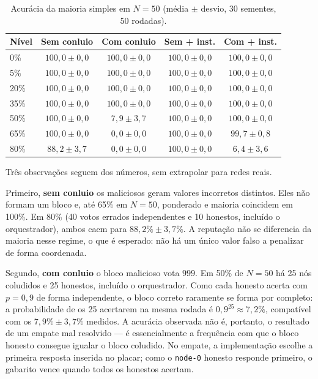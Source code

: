 \documentclass[12pt]{article}
\begin{document}
\begin{table}[htbp]
\centering
\caption{Acurácia da maioria simples em $N=50$ (média $\pm$ desvio, 30 sementes, 50 rodadas).}
\label{tab:n50-maj}
\footnotesize
\begin{tabular}{|l|c|c|c|c|}
\hline
\textbf{Nível} & \textbf{Sem conluio} & \textbf{Com conluio} & \textbf{Sem + inst.} & \textbf{Com + inst.} \\
\hline
0\%  & $100{,}0\pm 0{,}0$ & $100{,}0\pm 0{,}0$ & $100{,}0\pm 0{,}0$ & $100{,}0\pm 0{,}0$ \\
5\%  & $100{,}0\pm 0{,}0$ & $100{,}0\pm 0{,}0$ & $100{,}0\pm 0{,}0$ & $100{,}0\pm 0{,}0$ \\
20\% & $100{,}0\pm 0{,}0$ & $100{,}0\pm 0{,}0$ & $100{,}0\pm 0{,}0$ & $100{,}0\pm 0{,}0$ \\
35\% & $100{,}0\pm 0{,}0$ & $100{,}0\pm 0{,}0$ & $100{,}0\pm 0{,}0$ & $100{,}0\pm 0{,}0$ \\
50\% & $100{,}0\pm 0{,}0$ & $7{,}9\pm 3{,}7$   & $100{,}0\pm 0{,}0$ & $100{,}0\pm 0{,}0$ \\
65\% & $100{,}0\pm 0{,}0$ & $0{,}0\pm 0{,}0$   & $100{,}0\pm 0{,}0$ & $99{,}7\pm 0{,}8$ \\
80\% & $88{,}2\pm 3{,}7$  & $0{,}0\pm 0{,}0$   & $100{,}0\pm 0{,}0$ & $6{,}4\pm 3{,}6$ \\
\hline
\end{tabular}
\end{table}

Três observações seguem dos números, sem extrapolar para redes reais.

Primeiro, \textbf{sem conluio} os maliciosos geram valores incorretos distintos. Eles não formam um bloco e, até 65\% em $N=50$, ponderado e maioria coincidem em 100\%. Em 80\% (40 votos errados independentes e 10 honestos, incluído o orquestrador), ambos caem para $88{,}2\%\pm 3{,}7\%$. A reputação não se diferencia da maioria nesse regime, o que é esperado: não há um único valor falso a penalizar de forma coordenada.

Segundo, \textbf{com conluio} o bloco malicioso vota $999$. Em 50\% de $N=50$ há 25 nós coludidos e 25 honestos, incluído o orquestrador. Como cada honesto acerta com $p=0{,}9$ de forma independente, o bloco correto raramente se forma por completo: a probabilidade de os 25 acertarem na mesma rodada é $0{,}9^{25} \approx 7{,}2\%$, compatível com os $7{,}9\%\pm 3{,}7\%$ medidos. A acurácia observada não é, portanto, o resultado de um empate mal resolvido --- é essencialmente a frequência com que o bloco honesto consegue igualar o bloco coludido. No empate, a implementação escolhe a primeira resposta inserida no placar; como o \texttt{node-0} honesto responde primeiro, o gabarito vence quando todos os honestos acertam.
\end{document}
